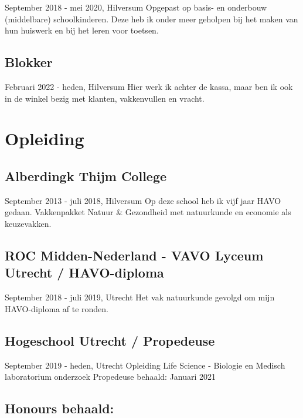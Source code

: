 \documentclass[
]{book}
\begin{document}
September 2018 - mei 2020, Hilversum
Opgepast op basis- en onderbouw (middelbare) schoolkinderen. Deze heb ik onder meer geholpen bij het maken van hun huiswerk en bij het leren voor toetsen.

\hypertarget{blokker}{%
\subsection{Blokker}\label{blokker}}

Februari 2022 - heden, Hilversum
Hier werk ik achter de kassa, maar ben ik ook in de winkel bezig met klanten, vakkenvullen en vracht.

\hypertarget{opleiding}{%
\section{Opleiding}\label{opleiding}}

\hypertarget{alberdingk-thijm-college}{%
\subsection{Alberdingk Thijm College}\label{alberdingk-thijm-college}}

September 2013 - juli 2018, Hilversum
Op deze school heb ik vijf jaar HAVO gedaan.
Vakkenpakket Natuur \& Gezondheid met natuurkunde en economie als keuzevakken.

\hypertarget{roc-midden-nederland---vavo-lyceum-utrecht-havo-diploma}{%
\subsection{ROC Midden-Nederland - VAVO Lyceum Utrecht / HAVO-diploma}\label{roc-midden-nederland---vavo-lyceum-utrecht-havo-diploma}}

September 2018 - juli 2019, Utrecht
Het vak natuurkunde gevolgd om mijn HAVO-diploma af te ronden.

\hypertarget{hogeschool-utrecht-propedeuse}{%
\subsection{Hogeschool Utrecht / Propedeuse}\label{hogeschool-utrecht-propedeuse}}

September 2019 - heden, Utrecht
Opleiding Life Science - Biologie en Medisch laboratorium onderzoek
Propedeuse behaald: Januari 2021

\hypertarget{honours-behaald}{%
\subsection{Honours behaald:}\label{honours-behaald}}
\end{document}
